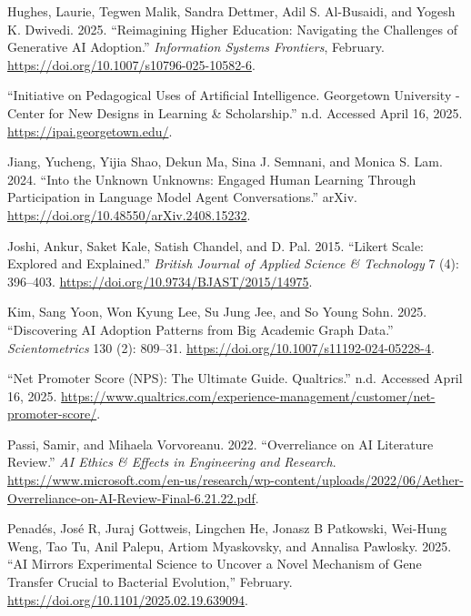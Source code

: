 \documentclass[
]{article}
\newlength{\cslhangindent}
\newenvironment{CSLReferences}[2] %
 {\begin{list}{}{%
  \setlength{\itemindent}{0pt}
  \setlength{\leftmargin}{0pt}
  \setlength{\parsep}{0pt}
  \ifodd #1
   \setlength{\leftmargin}{\cslhangindent}
   \setlength{\itemindent}{-1\cslhangindent}
  \fi
  \setlength{\itemsep}{#2\baselineskip}}}
 {\end{list}}
\begin{document}
\begin{CSLReferences}{1}{0}
Hughes, Laurie, Tegwen Malik, Sandra Dettmer, Adil S. Al-Busaidi, and
Yogesh K. Dwivedi. 2025. {``Reimagining Higher Education: Navigating the
Challenges of Generative {AI} Adoption.''} \emph{Information Systems
Frontiers}, February. \url{https://doi.org/10.1007/s10796-025-10582-6}.

{``Initiative on Pedagogical Uses of Artificial Intelligence. Georgetown
University - Center for New Designs in Learning \& Scholarship.''} n.d.
Accessed April 16, 2025. \url{https://ipai.georgetown.edu/}.

Jiang, Yucheng, Yijia Shao, Dekun Ma, Sina J. Semnani, and Monica S.
Lam. 2024. {``Into the Unknown Unknowns: Engaged Human Learning Through
Participation in Language Model Agent Conversations.''} {arXiv}.
\url{https://doi.org/10.48550/arXiv.2408.15232}.

Joshi, Ankur, Saket Kale, Satish Chandel, and D. Pal. 2015. {``Likert
Scale: Explored and Explained.''} \emph{British Journal of Applied
Science \& Technology} 7 (4): 396--403.
\url{https://doi.org/10.9734/BJAST/2015/14975}.

Kim, Sang Yoon, Won Kyung Lee, Su Jung Jee, and So Young Sohn. 2025.
{``Discovering {AI} Adoption Patterns from Big Academic Graph Data.''}
\emph{Scientometrics} 130 (2): 809--31.
\url{https://doi.org/10.1007/s11192-024-05228-4}.

{``Net Promoter Score ({NPS}): The Ultimate Guide. Qualtrics.''} n.d.
Accessed April 16, 2025.
\url{https://www.qualtrics.com/experience-management/customer/net-promoter-score/}.

Passi, Samir, and Mihaela Vorvoreanu. 2022. {``Overreliance on {AI}
Literature Review.''} \emph{{AI} Ethics \& Effects in Engineering and
Research}.
\url{https://www.microsoft.com/en-us/research/wp-content/uploads/2022/06/Aether-Overreliance-on-AI-Review-Final-6.21.22.pdf}.

Penadés, José R, Juraj Gottweis, Lingchen He, Jonasz B Patkowski,
Wei-Hung Weng, Tao Tu, Anil Palepu, Artiom Myaskovsky, and Annalisa
Pawlosky. 2025. {``{AI} Mirrors Experimental Science to Uncover a Novel
Mechanism of Gene Transfer Crucial to Bacterial Evolution,''} February.
\url{https://doi.org/10.1101/2025.02.19.639094}.


\end{CSLReferences}
\end{document}
